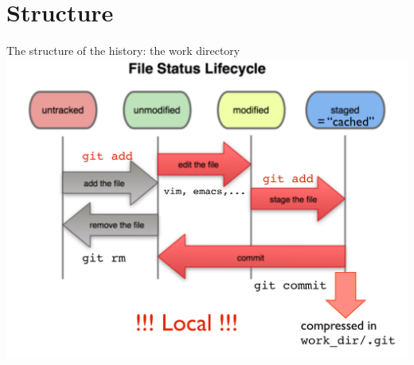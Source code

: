 \documentclass{beamer}
\begin{document}
\section{Structure}
\begin{frame}{The structure of the history: the work directory }
\includegraphics[page=1,width=\textwidth]{local}
\end{frame}
\end{document}
